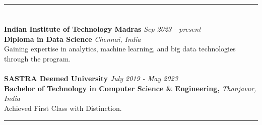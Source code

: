\documentclass[a4paper,10pt]{article}
\begin{document}
\hrule
\section{\scshape\color{Fuchsia}{\faGraduationCap\ \textbf EDUCATION}}
\textbf{Indian Institute of Technology Madras} \href{https://drive.google.com/file/d/1HUZf7LIsTZaPjUkf3tKMAnduHmgObdS1/view?usp=sharing}{} \hfill \textit{Sep 2023 - present} \\
\textbf{Diploma in Data Science} \hfill \textit{Chennai, India} \\
Gaining expertise in analytics, machine learning, and big data technologies through the program. \\
\\
\textbf{SASTRA Deemed University} \href{https://drive.google.com/file/d/1phkkQpvXzo3_0dZZnujCL_nOU1YJfxKO/view?usp=sharing}{} \hfill \textit{July 2019 - May 2023} \\
\textbf{Bachelor of Technology in Computer Science \& Engineering,} \hfill \textit{Thanjavur, India} \\
Achieved First Class with Distinction. \\

\hrule
\end{document}
